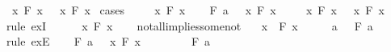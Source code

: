 \begin{isabellebody}
%
\endisatagproof
{\isafoldproof}%
%
\isadelimproof
%
\endisadelimproof
%
\begin{isamarkuptext}%
\begin{Answer}[ref = drinker] \end{Answer}%
\end{isamarkuptext}\isamarkuptrue%
\isamarkupfalse%
\ {\isachardoublequoteopen}{\isasymexists}\ x{\isachardot}\ F\ x\ {\isasymlongrightarrow}\ {\isacharparenleft}{\isasymforall}\ x{\isachardot}\ F\ x{\isacharparenright}{\isachardoublequoteclose}\isanewline
%
\isadelimproof
%
\endisadelimproof
%
\isatagproof
{}\isamarkupfalse%
\ cases\isanewline
\ \ \isamarkupfalse%
\ {\isachardoublequoteopen}{\isasymforall}\ x{\isachardot}\ F\ x{\isachardoublequoteclose}\isanewline
\ \ \isamarkupfalse%
\ {\isachardoublequoteopen}F\ a\ {\isasymlongrightarrow}\ {\isacharparenleft}{\isasymforall}\ x{\isachardot}\ F\ x{\isacharparenright}{\isachardoublequoteclose}\isacommand{{\isachardot}{\isachardot}}\isamarkupfalse%
\isanewline
\ \ \isamarkupfalse%
\ {\isachardoublequoteopen}{\isasymexists}\ x{\isachardot}\ F\ x\ {\isasymlongrightarrow}\ {\isacharparenleft}{\isasymforall}\ x{\isachardot}\ F\ x{\isacharparenright}{\isachardoublequoteclose}\ \isamarkupfalse%
\ {\isacharparenleft}rule\ exI{\isacharparenright}\isanewline
{}\isamarkupfalse%
\isanewline
\ \ \isamarkupfalse%
\ {\isachardoublequoteopen}{\isasymnot}\ {\isacharparenleft}{\isasymforall}\ x{\isachardot}\ F\ x{\isacharparenright}{\isachardoublequoteclose}\isanewline
\ \ \isamarkupfalse%
\ not{\isacharunderscore}all{\isacharunderscore}implies{\isacharunderscore}some{\isacharunderscore}not\ \isamarkupfalse%
\ {\isachardoublequoteopen}{\isasymexists}\ x{\isachardot}\ {\isasymnot}\ F\ x{\isachardoublequoteclose}\isacommand{{\isachardot}{\isachardot}}\isamarkupfalse%
\isanewline
\ \ \isamarkupfalse%
\ \isamarkupfalse%
\ a\ \ {\isachardoublequoteopen}{\isasymnot}\ F\ a{\isachardoublequoteclose}\ \isamarkupfalse%
\ {\isacharparenleft}rule\ exE{\isacharparenright}\isanewline
\ \ \isamarkupfalse%
\ {\isachardoublequoteopen}F\ a\ {\isasymlongrightarrow}\ {\isacharparenleft}{\isasymforall}\ x{\isachardot}\ F\ x{\isacharparenright}{\isachardoublequoteclose}\isanewline
\ \ \isamarkupfalse%
\isanewline
\ \ \ \ \isamarkupfalse%
\ {\isachardoublequoteopen}F\ a{\isachardoublequoteclose}\isanewline

\end{isabellebody}
